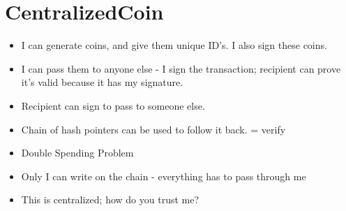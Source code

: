 \documentclass{article}
\begin{document}
\section*{CentralizedCoin}
\begin{itemize}
  \item I can generate coins, and give them unique ID's. I also sign these coins.
  \item I can pass them to anyone else - I sign the transaction; recipient can prove it's valid because it has my signature.
  \item Recipient can sign to pass to someone else. 
  \item Chain of hash pointers can be used to follow it back. = verify
  \item Double Spending Problem
  \item Only I can write on the chain - everything has to pass through me
  \item This is centralized; how do you trust me? 
\end{itemize}
\end{document}
